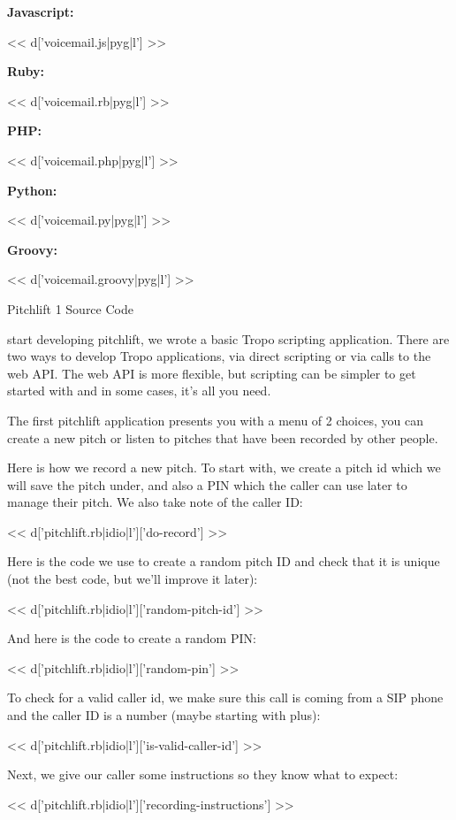 \documentclass[custom, plainsections]{sciposter}
\begin{document}
\begin{multicols*}{2}
\textbf{Javascript:}

<< d['voicemail.js|pyg|l'] >>

\textbf{Ruby:}

<< d['voicemail.rb|pyg|l'] >>

\textbf{PHP:}

<< d['voicemail.php|pyg|l'] >>

\textbf{Python:}

<< d['voicemail.py|pyg|l'] >>

\textbf{Groovy:}

<< d['voicemail.groovy|pyg|l'] >>

\large
Pitchlift 1 Source Code
\small

\label{sec:pitchlift-1}

\vspace{5pt}

 start developing pitchlift, we wrote a basic Tropo scripting application. There are two ways to develop Tropo applications, via direct scripting or via calls to the web API. The web API is more flexible, but scripting can be simpler to get started with and in some cases, it's all you need.

The first pitchlift application presents you with a menu of 2 choices, you can create a new pitch or listen to pitches that have been recorded by other people.

Here is how we record a new pitch. To start with, we create a pitch id which we will save the pitch under, and also a PIN which the caller can use later to manage their pitch. We also take note of the caller ID:

<< d['pitchlift.rb|idio|l']['do-record'] >>

Here is the code we use to create a random pitch ID and check that it is unique (not the best code, but we'll improve it later):

<< d['pitchlift.rb|idio|l']['random-pitch-id'] >>

And here is the code to create a random PIN:

<< d['pitchlift.rb|idio|l']['random-pin'] >>

To check for a valid caller id, we make sure this call is coming from a SIP phone and the caller ID is a number (maybe starting with plus):

<< d['pitchlift.rb|idio|l']['is-valid-caller-id'] >>

Next, we give our caller some instructions so they know what to expect:

<< d['pitchlift.rb|idio|l']['recording-instructions'] >>


\end{multicols*}
\end{document}
